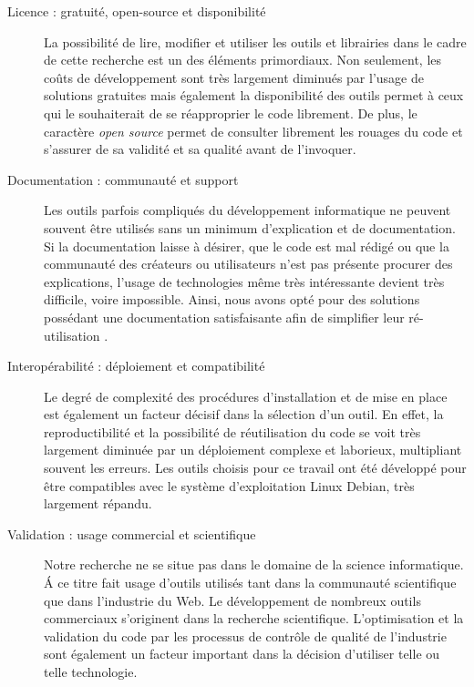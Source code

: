     \begin{description}
        \item[Licence : gratuité, open-source et disponibilité]
            La possibilité de lire, modifier et utiliser les outils et librairies dans le cadre de cette recherche est un des éléments primordiaux. Non seulement, les coûts de développement sont très largement diminués par l'usage de solutions gratuites mais également la disponibilité des outils permet à ceux qui le souhaiterait de se réapproprier le code librement. De plus, le caractère \textit{open source} permet de consulter librement les rouages du code et s'assurer de sa validité et sa qualité avant de l'invoquer.

        \item[Documentation : communauté et support]
            Les outils parfois compliqués du développement informatique ne peuvent souvent être utilisés sans un minimum d'explication et de documentation. Si la documentation laisse à désirer, que le code est mal rédigé ou que la communauté des créateurs ou utilisateurs n'est pas présente procurer des explications, l'usage de technologies même très intéressante devient très difficile, voire impossible. Ainsi, nous avons opté pour des solutions possédant une documentation satisfaisante afin de simplifier leur ré-utilisation .

        \item[Interopérabilité : déploiement et compatibilité]
            Le degré de complexité des procédures d'installation et de mise en place est également un facteur décisif dans la sélection d'un outil. En effet, la reproductibilité et la possibilité de réutilisation du code se voit très largement diminuée par un déploiement complexe et laborieux, multipliant souvent les erreurs. Les outils choisis pour ce travail ont été développé pour être compatibles avec le système d'exploitation Linux Debian, très largement répandu.

        \item[Validation : usage commercial et scientifique]
            Notre recherche ne se situe pas dans le domaine de la science informatique. \'A ce titre fait usage d'outils utilisés tant dans la communauté scientifique que dans l'industrie du Web. Le développement de nombreux  outils commerciaux s'originent dans la recherche scientifique. L'optimisation et la validation du code par les processus de contrôle de qualité de l'industrie sont également un facteur important dans la décision d'utiliser telle ou telle technologie.
    \end{description}

